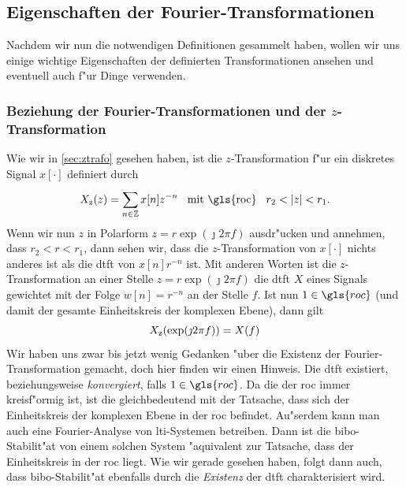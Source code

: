 \subsection{Eigenschaften der Fourier-Transformationen}\label{sec:fourier:proper}
%
Nachdem wir nun die notwendigen Definitionen gesammelt haben, wollen wir uns einige wichtige Eigenschaften der definierten Transformationen ansehen und eventuell auch f"ur  Dinge verwenden.
%
\subsubsection{Beziehung der Fourier-Transformationen und der \texorpdfstring{$z$}{z}-Transformation}
%
Wie wir in \cref{sec:ztrafo} gesehen haben, ist die $z$-Transformation f"ur ein diskretes Signal $x[\cdot]$ definiert durch
\[
X_{\z}(z) = \Sum{n \in \Z}{}{x[n]z^{-n}} \Text{mit \gls{roc}} r_2 < \Abs{z} < r_1.
\]
Wenn wir nun $z$ in Polarform $z = r \exp(\jmath 2 \pi f)$ ausdr"ucken und annehmen, dass $r_2 < r < r_1$, dann sehen wir, dass die $z$-Transformation von $x[\cdot]$ nichts anderes ist als die \gls{dtft} von $x[n] r^{-n}$ ist.
Mit anderen Worten ist die $z$-Transformation an einer Stelle $z=r \exp(\jmath 2 \pi f)$ die \gls{dtft} $X$ eines Signals gewichtet mit der Folge $w[n] = r^{-n}$ an der Stelle $f$.
Ist nun $1 \in \gls{roc}$ (und damit der gesamte Einheitskreis der komplexen Ebene), dann gilt
\begin{equation}\label{eq:fourier:ztrafo}
    X_{{\rm z}}(\exp(\jmath 2 \pi f)) = X(f)
\end{equation}
Wir haben uns zwar bis jetzt wenig Gedanken "uber die Existenz der Fourier-Transformation gemacht, doch hier finden wir einen Hinweis. 
Die \gls{dtft} existiert, beziehungsweise \emph{konvergiert}, falls $1 \in \gls{roc}$.
Da die  der \gls{roc} immer kreisf"ormig ist, ist die gleichbedeutend mit der Tatsache, dass sich der Einheitskreis der komplexen Ebene in der \gls{roc} befindet.
Au"serdem kann man auch eine Fourier-Analyse von \gls{lti}-Systemen betreiben. 
Dann ist die \gls{bibo}-Stabilit"at von einem solchen System "aquivalent zur Tatsache, dass der Einheitskreis in der \gls{roc} liegt.
Wie wir gerade gesehen haben, folgt dann auch, dass \gls{bibo}-Stabilit"at ebenfalls durch die \emph{Existenz} der \gls{dtft} charakterisiert wird.
%
